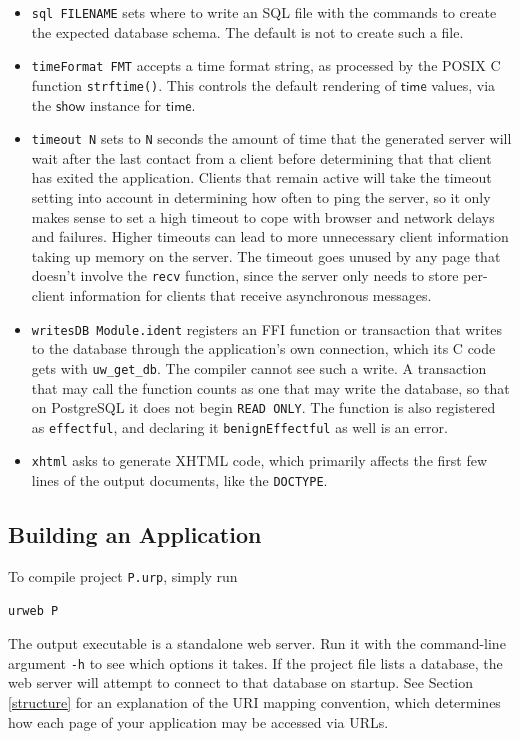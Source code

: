 \documentclass{article}
\newcommand{\mt}[1]{\mathsf{#1}}
\begin{document}
\begin{itemize}
\item \texttt{sql FILENAME} sets where to write an SQL file with the commands to create the expected database schema.  The default is not to create such a file.
\item \texttt{timeFormat FMT} accepts a time format string, as processed by the POSIX C function \texttt{strftime()}.  This controls the default rendering of $\mt{time}$ values, via the $\mt{show}$ instance for $\mt{time}$.
\item \texttt{timeout N} sets to \texttt{N} seconds the amount of time that the generated server will wait after the last contact from a client before determining that that client has exited the application.  Clients that remain active will take the timeout setting into account in determining how often to ping the server, so it only makes sense to set a high timeout to cope with browser and network delays and failures.  Higher timeouts can lead to more unnecessary client information taking up memory on the server.  The timeout goes unused by any page that doesn't involve the \texttt{recv} function, since the server only needs to store per-client information for clients that receive asynchronous messages.
\item \texttt{writesDB Module.ident} registers an FFI function or transaction that writes to the database through the application's own connection, which its C code gets with \texttt{uw\_get\_db}.  The compiler cannot see such a write.  A transaction that may call the function counts as one that may write the database, so that on PostgreSQL it does not begin \texttt{READ ONLY}.  The function is also registered as \texttt{effectful}, and declaring it \texttt{benignEffectful} as well is an error.
\item \texttt{xhtml} asks to generate XHTML code, which primarily affects the first few lines of the output documents, like the \texttt{DOCTYPE}.
\end{itemize}


\subsection{Building an Application}
\label{sec:building}

To compile project \texttt{P.urp}, simply run
\begin{verbatim}
urweb P
\end{verbatim}
The output executable is a standalone web server.  Run it with the command-line argument \texttt{-h} to see which options it takes.  If the project file lists a database, the web server will attempt to connect to that database on startup.  See Section \ref{structure} for an explanation of the URI mapping convention, which determines how each page of your application may be accessed via URLs.
\end{document}
